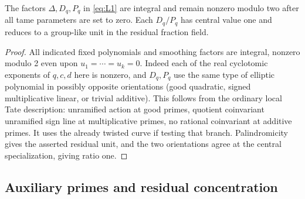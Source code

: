 \begin{lemma}\label{lem:positive-determinant:factors}
The factors \(\Delta,D_q,P_q\) in \eqref{eq:L1} are integral and remain
nonzero modulo two after all tame parameters are set to zero. Each
\(D_q/P_q\) has central value one and reduces to a group-like unit in the
residual fraction field.
\end{lemma}
\begin{proof}

All indicated fixed polynomials and smoothing factors are integral, nonzero modulo 2 even upon \(u_1=\cdots=u_k=0\). Indeed each of the real cyclotomic exponents of \(q,c,d\) here is nonzero, and \(D_q,P_q\) use the same type of elliptic polynomial in possibly opposite orientations (good quadratic, signed multiplicative linear, or trivial additive). This follows from the ordinary local Tate description: unramified action at good primes, quotient coinvariant unramified sign line at multiplicative primes, no rational coinvariant at additive primes. It uses the already twisted curve if testing that branch. Palindromicity gives the asserted residual unit, and the two orientations
agree at the central specialization, giving ratio one.
\end{proof}

\subsection{Auxiliary primes and residual concentration}\label{subsec:positive-determinant:residual}

